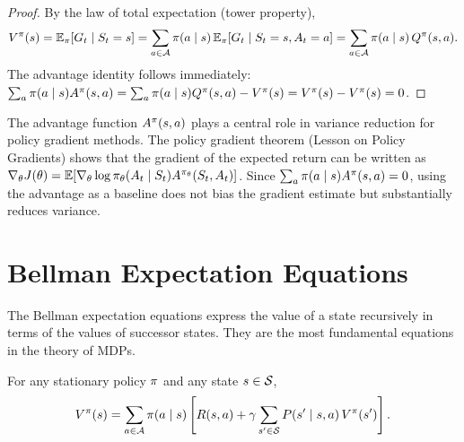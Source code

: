 \documentclass[11pt,a4paper]{article}
\begin{document}
\begin{proof}
By the law of total expectation (tower property),
\[
    V^{\pi}(s)
    = \mathbb{E}_\pi[G_t \mid S_t = s]
    = \sum_{a \in \mathcal{A}} \pi(a \mid s)\,
      \mathbb{E}_\pi[G_t \mid S_t = s, A_t = a]
    = \sum_{a \in \mathcal{A}} \pi(a \mid s)\, Q^{\pi}(s,a).
\]
The advantage identity follows immediately:
$\sum_a \pi(a \mid s) A^\pi(s,a)
= \sum_a \pi(a \mid s) Q^{\pi}(s,a) - V^{\pi}(s)
= V^{\pi}(s) - V^{\pi}(s) = 0$.
\end{proof}

\begin{rlconnection}[title={Advantage Functions in Policy Gradients}]
The advantage function $A^\pi(s,a)$ plays a central role in
variance reduction for policy gradient methods. The policy gradient
theorem (Lesson on Policy Gradients) shows that the gradient of the
expected return can be written as
$\nabla_\theta J(\theta) = \mathbb{E}[\nabla_\theta \log \pi_\theta(A_t
\mid S_t) A^{\pi_\theta}(S_t, A_t)]$. Since
$\sum_a \pi(a \mid s) A^\pi(s,a) = 0$, using the advantage
as a baseline does not bias the gradient estimate but substantially
reduces variance.
\end{rlconnection}


\section{Bellman Expectation Equations}
\label{sec:bellman-expectation}

The Bellman expectation equations express the value of a state
recursively in terms of the values of successor states. They are the
most fundamental equations in the theory of MDPs.

\begin{theorem}
\label{thm:bellman-v}
For any stationary policy $\pi$ and any state $s \in \mathcal{S}$,
\begin{equation}
\label{eq:bellman-v}
    V^{\pi}(s) = \sum_{a \in \mathcal{A}} \pi(a \mid s)
    \left[ R(s,a) + \gamma \sum_{s' \in \mathcal{S}}
    P(s' \mid s,a)\, V^{\pi}(s') \right].
\end{equation}
\end{theorem}
\end{document}
